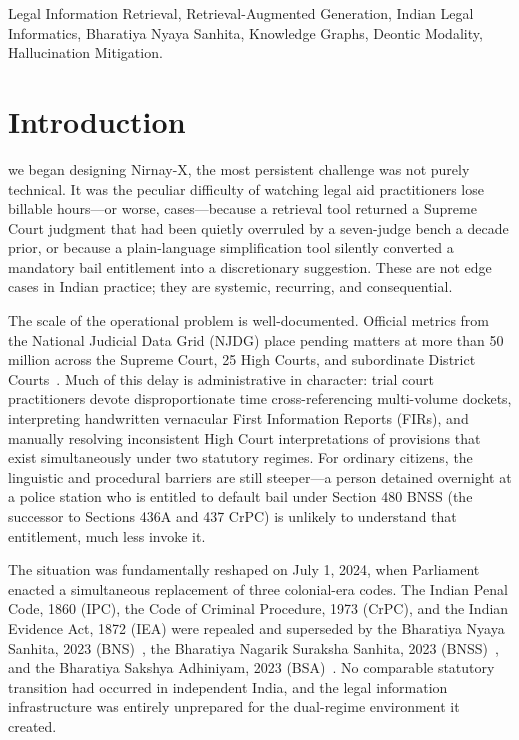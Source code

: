 \documentclass[conference]{IEEEtran}
\begin{document}
\begin{IEEEkeywords}
Legal Information Retrieval, Retrieval-Augmented Generation, Indian Legal Informatics, Bharatiya Nyaya Sanhita, Knowledge Graphs, Deontic Modality, Hallucination Mitigation.
\end{IEEEkeywords}

\section{Introduction}
 we began designing Nirnay-X, the most persistent challenge was not purely technical. It was the peculiar difficulty of watching legal aid practitioners lose billable hours---or worse, cases---because a retrieval tool returned a Supreme Court judgment that had been quietly overruled by a seven-judge bench a decade prior, or because a plain-language simplification tool silently converted a mandatory bail entitlement into a discretionary suggestion. These are not edge cases in Indian practice; they are systemic, recurring, and consequential.

The scale of the operational problem is well-documented. Official metrics from the National Judicial Data Grid (NJDG) place pending matters at more than 50 million across the Supreme Court, 25 High Courts, and subordinate District Courts~\cite{njdg2024}. Much of this delay is administrative in character: trial court practitioners devote disproportionate time cross-referencing multi-volume dockets, interpreting handwritten vernacular First Information Reports (FIRs), and manually resolving inconsistent High Court interpretations of provisions that exist simultaneously under two statutory regimes. For ordinary citizens, the linguistic and procedural barriers are still steeper---a person detained overnight at a police station who is entitled to default bail under Section 480 BNSS (the successor to Sections 436A and 437 CrPC) is unlikely to understand that entitlement, much less invoke it.

The situation was fundamentally reshaped on July 1, 2024, when Parliament enacted a simultaneous replacement of three colonial-era codes. The Indian Penal Code, 1860 (IPC), the Code of Criminal Procedure, 1973 (CrPC), and the Indian Evidence Act, 1872 (IEA) were repealed and superseded by the Bharatiya Nyaya Sanhita, 2023 (BNS)~\cite{bns2023}, the Bharatiya Nagarik Suraksha Sanhita, 2023 (BNSS)~\cite{bnss2023}, and the Bharatiya Sakshya Adhiniyam, 2023 (BSA)~\cite{bsa2023}. No comparable statutory transition had occurred in independent India, and the legal information infrastructure was entirely unprepared for the dual-regime environment it created.
\end{document}

